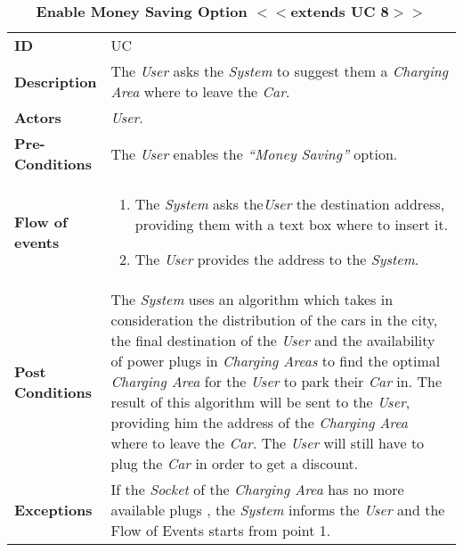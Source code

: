 \begin{longtable}{|p{0.2\linewidth} p{0.8\linewidth}|}
	\captionsetup{labelformat=empty} %
	\caption{\textbf{Enable Money Saving Option $<<$extends UC 8$>>$}} %
	\label{UC_PlugCar}%
	\\ \hline %
	
	\textbf{ID} & UC\theUseCaseIdCounter \\ \hline
	\textbf{Description} & The \emph{User} asks the \emph{System} to suggest them a \emph{Charging Area} where to leave the \emph{Car}. \\ \hline
	\textbf{Actors} & \emph{User}.\\ \hline
	\textbf{Pre-Conditions} & The \emph{User} enables the \textit{\textquotedblleft{Money Saving}\textquotedblright} option. \\ \hline
	\textbf{Flow of events} & 
	\begin{enumerate}
		\item The \emph{System} asks the\emph{User} the destination address, providing them with a text box where to insert it.
		\item The \emph{User} provides the address to the \emph{System}.
	\end{enumerate}	 \\ \hline
	\textbf{Post Conditions} & The \emph{System} uses an algorithm which takes in consideration the distribution of the cars in the city, the final destination of the \emph{User} and the availability of power plugs in \emph{Charging Areas} to find the optimal \emph{Charging Area} for the \emph{User} to park their \emph{Car} in. The result of this algorithm will be sent to the \emph{User}, providing him the address of the \emph{Charging Area} where to leave the \emph{Car}. The \emph{User} will still have to plug the \emph{Car} in order to get a discount.
	\\ \hline
	\textbf{Exceptions} & If the \emph{Socket} of the \emph{Charging Area} has no more available plugs , the \emph{System} informs the \emph{User} and the Flow of Events starts from point 1.\\ \hline
\end{longtable}
